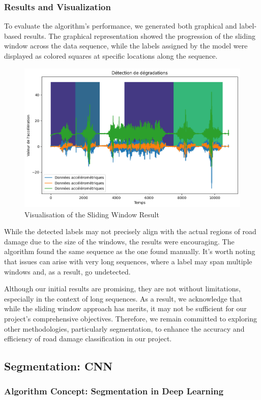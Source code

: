 \subsubsection{Results and Visualization}
To evaluate the algorithm's performance, we generated both graphical and label-based results. The graphical representation showed the progression of the sliding window across the data sequence, while the labels assigned by the model were displayed as colored squares at specific locations along the sequence.
\begin{figure}[H]
    \centering
    \includegraphics[width=0.5\linewidth]{sliding.png}
    \caption{Visualisation of the Sliding Window Result}
    \label{fig:enter-label}
\end{figure}


While the detected labels may not precisely align with the actual regions of road damage due to the size of the windows, the results were encouraging. The algorithm found the same sequence as the one found manually. It's worth noting that issues can arise with very long sequences, where a label may span multiple windows and, as a result, go undetected.

Although our initial results are promising, they are not without limitations, especially in the context of long sequences. As a result, we acknowledge that while the sliding window approach has merits, it may not be sufficient for our project's comprehensive objectives. Therefore, we remain committed to exploring other methodologies, particularly segmentation, to enhance the accuracy and efficiency of road damage classification in our project.


\subsection{Segmentation: CNN}

\subsubsection{Algorithm Concept: Segmentation in Deep Learning}


